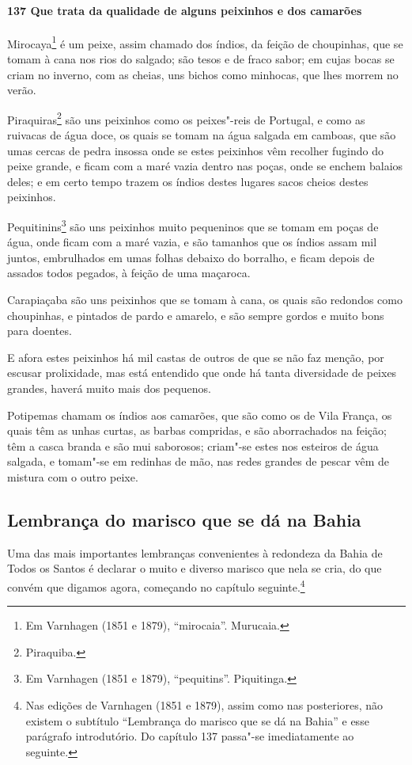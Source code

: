 \begin{linenumbers}
\paragraph{137 Que trata da qualidade de alguns peixinhos e dos camarões}\quad
Mirocaya\footnote{ Em Varnhagen (1851 e 1879), ``mirocaia''. Murucaia.} é um peixe, assim
chamado dos índios, da feição de choupinhas, que se tomam à cana nos rios do salgado; são
tesos e de fraco sabor; em cujas bocas se criam no inverno, com as cheias, uns bichos como
minhocas, que lhes morrem no verão.

Piraquiras\footnote{ Piraquiba.} são uns peixinhos como os peixes"-reis de Portugal, e como
as ruivacas de água doce, os quais se tomam na água salgada em camboas, que são umas
cercas de pedra insossa onde se estes peixinhos vêm recolher fugindo do peixe grande, e
ficam com a maré vazia dentro nas poças, onde se enchem balaios deles; e em certo tempo
trazem os índios destes lugares sacos cheios destes peixinhos.

Pequitinins\footnote{ Em Varnhagen (1851 e 1879), ``pequitins''. Piquitinga.} são uns
peixinhos muito pequeninos que se tomam em poças de água, onde ficam com a maré vazia, e
são tamanhos que os índios assam mil juntos, embrulhados em umas folhas debaixo do
borralho, e ficam depois de assados todos pegados, à feição de uma maçaroca.

Carapiaçaba são uns peixinhos que se tomam à cana, os quais são redondos como choupinhas,
e pintados de pardo e amarelo, e são sempre gordos e muito bons para doentes.

E afora estes peixinhos há mil castas de outros de que se não faz menção, por escusar
prolixidade, mas está entendido que onde há tanta diversidade de peixes grandes, haverá
muito mais dos pequenos.

Potipemas chamam os índios aos camarões, que são como os de Vila França, os quais têm as
unhas curtas, as barbas compridas, e são aborrachados na feição; têm a casca branda e são
mui saborosos; criam"-se estes nos esteiros de água salgada, e tomam"-se em redinhas de mão,
nas redes grandes de pescar vêm de mistura com o outro peixe.

\subsection{Lembrança do marisco que se dá na Bahia}

Uma das mais importantes lembranças convenientes à redondeza da Bahia de Todos os Santos é
declarar o muito e diverso marisco que nela se cria, do que convém que digamos agora,
começando no capítulo seguinte.\footnote{ Nas edições de Varnhagen (1851 e 1879), assim
como nas posteriores, não existem o subtítulo ``Lembrança do marisco que se dá na Bahia''
e esse parágrafo introdutório. Do capítulo 137 passa"-se imediatamente ao seguinte.}


\end{linenumbers}
